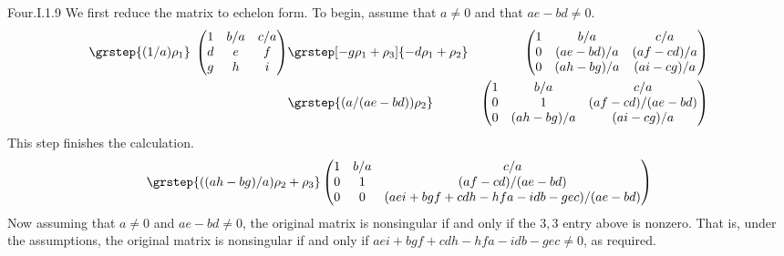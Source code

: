 \begin{ans}{Four.I.1.9}
      We first reduce the matrix to echelon form.
      To begin, assume that \( a\neq 0 \) and that \( ae-bd\neq 0 \).
      \begin{eqnarray*}
        \grstep{(1/a)\rho_1}\;
        \begin{pmatrix}
           1   &b/a   &c/a   \\
           d   &e     &f     \\
           g   &h     &i
         \end{pmatrix}
        &\grstep[-g\rho_1+\rho_3]{-d\rho_1+\rho_2}
        &\begin{pmatrix}
           1   &b/a           &c/a           \\
           0   &(ae-bd)/a     &(af-cd)/a     \\
           0   &(ah-bg)/a     &(ai-cg)/a
         \end{pmatrix}                                            \\
        &\grstep{(a/(ae-bd))\rho_2}
        &\begin{pmatrix}
           1   &b/a           &c/a             \\
           0   &1             &(af-cd)/(ae-bd) \\
           0   &(ah-bg)/a     &(ai-cg)/a
         \end{pmatrix}
      \end{eqnarray*}
      This step finishes the calculation.
      \begin{equation*}
        \grstep{((ah-bg)/a)\rho_2+\rho_3}
        \begin{pmatrix}
           1   &b/a    &c/a             \\
           0   &1      &(af-cd)/(ae-bd)      \\
           0   &0      &(aei+bgf+cdh-hfa-idb-gec)/(ae-bd)
         \end{pmatrix}
      \end{equation*}
      Now assuming that $a\neq 0$ and \( ae-bd\neq 0 \),
      the original matrix is nonsingular
      if and only if the \( 3,3 \) entry above is nonzero.
      That is, under the assumptions, the original matrix is
      nonsingular if and only if $aei+bgf+cdh-hfa-idb-gec\neq 0$,
      as required.


\end{ans}
